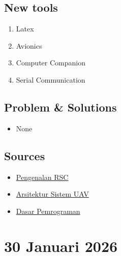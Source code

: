 \documentclass{article}
\begin{document}
\subsection{New tools}
\begin{enumerate}
    \item Latex
    \item Avionics
    \item Computer Companion
    \item Serial Communication
\end{enumerate}

\subsection{Problem \& Solutions}
\begin{itemize}
    \item None
\end{itemize}

\subsection{Sources}
\begin{itemize}
    \item \href{https://docs.google.com/presentation/d/1cosc8wM7Hahm7TQrdQiUQ329pnru50duFQHaYQCFLI8/edit?slide=id.g387762dc642_0_119#slide=id.g387762dc642_0_119}{Pengenalan RSC}
    \item \href{https://docs.google.com/presentation/d/1gMVQKaxRVKXiOE_kjEPgq1_8WiMdWHG5bLTf2ZVcDBU/edit?slide=id.g3b4dcdc285d_0_6#slide=id.g3b4dcdc285d_0_6}{Arsitektur Sistem UAV}
    \item \href{https://docs.google.com/presentation/d/1AzFyuYeqfNjdJ8JyxzHAkLFq5EKoJz9bRdj7aVJIyeY/edit?slide=id.g387762dc642_0_0#slide=id.g387762dc642_0_0}{Dasar Pemrograman}
\end{itemize}


\section{30 Januari 2026}
\end{document}
